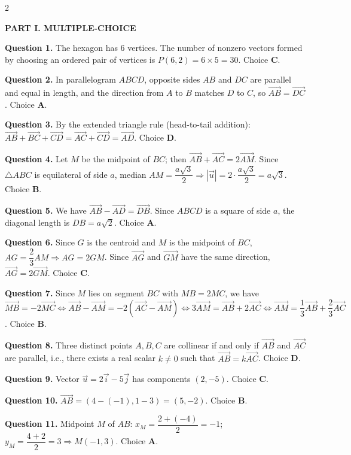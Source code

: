 \documentclass[10pt,a4paper]{article}
\begin{document}
\begin{multicols}{2}
\raggedcolumns
\small

\textbf{\color{accent}PART I. MULTIPLE-CHOICE}

\textbf{Question 1.} The hexagon has $6$ vertices. The number of nonzero vectors formed by choosing an ordered pair of vertices is $P(6,2) = 6 \times 5 = 30$. Choice \textbf{C}.

\textbf{Question 2.} In parallelogram $ABCD$, opposite sides $AB$ and $DC$ are parallel and equal in length, and the direction from $A$ to $B$ matches $D$ to $C$, so $\vec{AB} = \vec{DC}$. Choice \textbf{A}.

\textbf{Question 3.} By the extended triangle rule (head-to-tail addition): $\vec{AB} + \vec{BC} + \vec{CD} = \vec{AC} + \vec{CD} = \vec{AD}$. Choice \textbf{D}.

\textbf{Question 4.} Let $M$ be the midpoint of $BC$; then $\vec{AB} + \vec{AC} = 2\vec{AM}$. Since $\triangle ABC$ is equilateral of side $a$, median $AM = \dfrac{a\sqrt{3}}{2} \Rightarrow |\vec{u}| = 2 \cdot \dfrac{a\sqrt{3}}{2} = a\sqrt{3}$. Choice \textbf{B}.

\textbf{Question 5.} We have $\vec{AB} - \vec{AD} = \vec{DB}$. Since $ABCD$ is a square of side $a$, the diagonal length is $DB = a\sqrt{2}$. Choice \textbf{A}.

\textbf{Question 6.} Since $G$ is the centroid and $M$ is the midpoint of $BC$, $AG = \dfrac{2}{3}AM \Rightarrow AG = 2GM$. Since $\vec{AG}$ and $\vec{GM}$ have the same direction, $\vec{AG} = 2\vec{GM}$. Choice \textbf{C}.

\textbf{Question 7.} Since $M$ lies on segment $BC$ with $MB = 2MC$, we have $\vec{MB} = -2\vec{MC} \Leftrightarrow \vec{AB} - \vec{AM} = -2(\vec{AC} - \vec{AM}) \Leftrightarrow 3\vec{AM} = \vec{AB} + 2\vec{AC} \Leftrightarrow \vec{AM} = \dfrac{1}{3}\vec{AB} + \dfrac{2}{3}\vec{AC}$. Choice \textbf{B}.

\textbf{Question 8.} Three distinct points $A, B, C$ are collinear if and only if $\vec{AB}$ and $\vec{AC}$ are parallel, i.e., there exists a real scalar $k \ne 0$ such that $\vec{AB} = k\vec{AC}$. Choice \textbf{D}.

\textbf{Question 9.} Vector $\vec{u} = 2\vec{i} - 5\vec{j}$ has components $(2, -5)$. Choice \textbf{C}.

\textbf{Question 10.} $\vec{AB} = (4 - (-1), 1 - 3) = (5, -2)$. Choice \textbf{B}.

\textbf{Question 11.} Midpoint $M$ of $AB$: $x_M = \dfrac{2 + (-4)}{2} = -1$; $y_M = \dfrac{4 + 2}{2} = 3 \Rightarrow M(-1, 3)$. Choice \textbf{A}.


\end{multicols}
\end{document}
